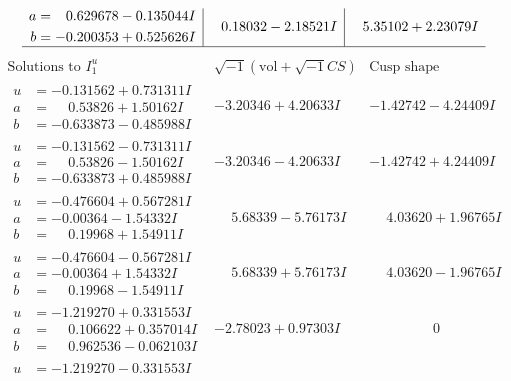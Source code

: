\documentclass[1p]{elsarticle_modified}
\theoremstyle{definition}
\newcommand{\I}{\sqrt{-1}}
\begin{document}
$$\begin{array}{c|c|c}
\begin{aligned}
a &= \phantom{-}0.629678 - 0.135044 I \\
b &= -0.200353 + 0.525626 I\end{aligned}
 & \phantom{-}0.18032 - 2.18521 I & \phantom{-}5.35102 + 2.23079 I\\
 \hline 
 \end{array}$$\newpage$$\begin{array}{c|c|c}  
\text{Solutions to }I^u_{1}& \I (\text{vol} + \sqrt{-1}CS) & \text{Cusp shape}\\
 \hline 
\begin{aligned}
u &= -0.131562 + 0.731311 I \\
a &= \phantom{-}0.53826 + 1.50162 I \\
b &= -0.633873 - 0.485988 I\end{aligned}
 & -3.20346 + 4.20633 I & -1.42742 - 4.24409 I \\ \hline\begin{aligned}
u &= -0.131562 - 0.731311 I \\
a &= \phantom{-}0.53826 - 1.50162 I \\
b &= -0.633873 + 0.485988 I\end{aligned}
 & -3.20346 - 4.20633 I & -1.42742 + 4.24409 I \\ \hline\begin{aligned}
u &= -0.476604 + 0.567281 I \\
a &= -0.00364 - 1.54332 I \\
b &= \phantom{-}0.19968 + 1.54911 I\end{aligned}
 & \phantom{-}5.68339 - 5.76173 I & \phantom{-}4.03620 + 1.96765 I \\ \hline\begin{aligned}
u &= -0.476604 - 0.567281 I \\
a &= -0.00364 + 1.54332 I \\
b &= \phantom{-}0.19968 - 1.54911 I\end{aligned}
 & \phantom{-}5.68339 + 5.76173 I & \phantom{-}4.03620 - 1.96765 I \\ \hline\begin{aligned}
u &= -1.219270 + 0.331553 I \\
a &= \phantom{-}0.106622 + 0.357014 I \\
b &= \phantom{-}0.962536 - 0.062103 I\end{aligned}
 & -2.78023 + 0.97303 I & \phantom{-0.000000 } 0 \\ \hline\begin{aligned}
u &= -1.219270 - 0.331553 I \\

\end{aligned}
\end{array}$$
\end{document}
